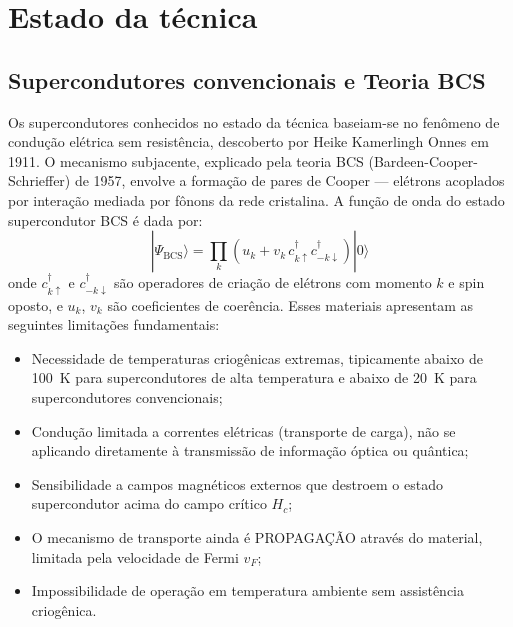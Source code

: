 \documentclass[12pt,a4paper]{article}
\begin{document}
\newpage
\section{Estado da técnica}

\subsection{Supercondutores convencionais e Teoria BCS}

Os supercondutores conhecidos no estado da técnica baseiam-se
no fenômeno de condução elétrica sem resistência, descoberto
por Heike Kamerlingh Onnes em 1911. O mecanismo subjacente,
explicado pela teoria BCS (Bardeen-Cooper-Schrieffer) de 1957,
envolve a formação de pares de Cooper --- elétrons acoplados
por interação mediada por fônons da rede cristalina. A função
de onda do estado supercondutor BCS é dada por:
\begin{equation}
|\Psi_{\text{BCS}}\rangle = \prod_k \left(u_k + v_k \,
  c^\dagger_{k\uparrow} c^\dagger_{-k\downarrow}\right)
  |0\rangle
\label{eq:bcs}
\end{equation}
onde $c^\dagger_{k\uparrow}$ e $c^\dagger_{-k\downarrow}$ são
operadores de criação de elétrons com momento $k$ e spin
oposto, e $u_k$, $v_k$ são coeficientes de coerência. Esses
materiais apresentam as seguintes limitações fundamentais:

\begin{itemize}[nosep]
\item Necessidade de temperaturas criogênicas extremas,
  tipicamente abaixo de 100~K para supercondutores de alta
  temperatura e abaixo de 20~K para supercondutores convencionais;
\item Condução limitada a correntes elétricas (transporte de
  carga), não se aplicando diretamente à transmissão de
  informação óptica ou quântica;
\item Sensibilidade a campos magnéticos externos que destroem
  o estado supercondutor acima do campo crítico $H_c$;
\item O mecanismo de transporte ainda é PROPAGAÇÃO através do
  material, limitada pela velocidade de Fermi $v_F$;
\item Impossibilidade de operação em temperatura ambiente sem
  assistência criogênica.
\end{itemize}
\end{document}
